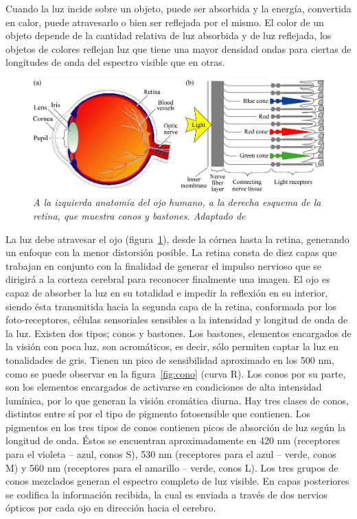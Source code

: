 Cuando la luz incide sobre un objeto, puede ser absorbida y la energía, convertida en calor, puede atravesarlo o bien ser reflejada por el mismo. El color de un objeto depende de la cantidad relativa de luz absorbida y de luz reflejada, los objetos de colores reflejan luz que tiene una mayor densidad ondas para ciertas de longitudes de onda del espectro visible que en otras. 

\begin{figure}[htc]
  \centering
  \includegraphics[scale=.4]{images/ojo}
  \caption{\em A la izquierda anatomía del ojo humano, a la derecha esquema de la retina, que muestra conos y bastones. Adaptado de \cite{Britannica1994}}  
  \label{fig:ojo}
\end{figure}

La luz debe atravesar el ojo (figura~\ref{fig:ojo}), desde la córnea hasta la retina, generando un enfoque con la menor distorsión posible. La retina consta de diez capas que trabajan en conjunto con la finalidad de generar el impulso nervioso que se dirigirá a la corteza cerebral para reconocer finalmente una imagen. El ojo es capaz de absorber la luz en su totalidad e impedir la reflexión en su interior, siendo ésta transmitida hacia la segunda capa de la retina, conformada por los foto-receptores, células sensoriales sensibles a la intensidad y longitud de onda de la luz. Existen dos tipos; conos y bastones. Los bastones, elementos encargados de la visión con poca luz, son acromáticos, es decir, sólo permiten captar la luz en tonalidades de gris. Tienen un pico de sensibilidad aproximado en los 500 nm, como se puede observar en la figura~\ref{fig:cono} (curva R). Los conos por su parte, son los elementos encargados de activarse en condiciones de alta intensidad lumínica, por lo que generan la visión cromática diurna. Hay tres clases de conos, distintos entre sí por el tipo de pigmento fotosensible que contienen. Los pigmentos en los tres tipos de conos contienen picos de absorción de luz según la longitud de onda. Éstos se encuentran aproximadamente en 420 nm (receptores para el violeta – azul, conos S), 530 nm (receptores para el azul – verde, conos M) y 560 nm (receptores para el amarillo – verde, conos L). Los tres grupos de conos mezclados generan el espectro completo de luz visible. En capas posteriores se codifica la información recibida, la cual es enviada a través de dos nervios ópticos por cada ojo en dirección hacia el cerebro.

